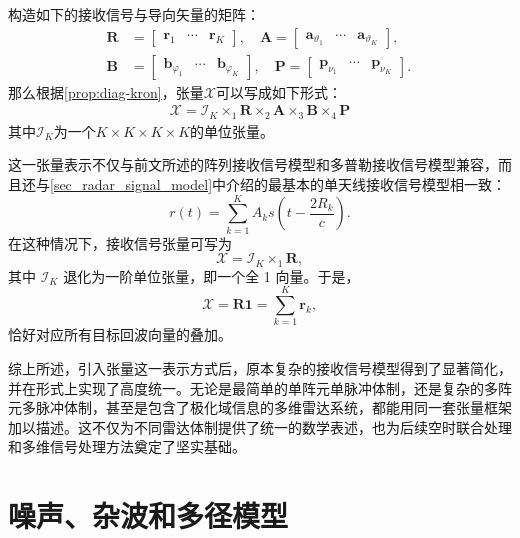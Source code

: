构造如下的接收信号与导向矢量的矩阵：
\[
    \begin{split}
        \mathbf{R} & = \begin{bmatrix}
                           \bm{r}_1 & \cdots & \bm{r}_K
                       \end{bmatrix}, \quad
        \mathbf{A} = \begin{bmatrix}
                         \bm{a}_{\vartheta_1} & \cdots & \bm{a}_{\vartheta_K}
                     \end{bmatrix}, \quad \\
        \mathbf{B} & = \begin{bmatrix}
                           \bm{b}_{\varphi_1} & \cdots & \bm{b}_{\varphi_K}
                       \end{bmatrix}, \quad
        \mathbf{P} = \begin{bmatrix}
                         \bm{p}_{\nu_1} & \cdots & \bm{p}_{\nu_K}
                     \end{bmatrix}.
    \end{split}
\]
那么根据\cref{prop:diag-kron}，张量\( \mathcal{X} \)可以写成如下形式：
\[
    \begin{split}
        \mathcal{X} = \mathcal{I}_K \times_1 \mathbf{R} \times_2 \mathbf{A} \times_3 \mathbf{B} \times_4 \mathbf{P}
    \end{split}
\]
其中\( \mathcal{I}_K \)为一个\( K \times K \times K \times K \)的单位张量。

这一张量表示不仅与前文所述的阵列接收信号模型和多普勒接收信号模型兼容，而且还与\cref{sec_radar_signal_model}中介绍的最基本的单天线接收信号模型相一致：
\[
    r(t) = \sum_{k=1}^{K} A_k s\!\left(t - \frac{2 R_k}{c}\right).
\]
在这种情况下，接收信号张量可写为
\[
    \mathcal{X} = \mathcal{I}_K \times_1 \mathbf{R},
\]
其中 \(\mathcal{I}_K\) 退化为一阶单位张量，即一个全 1 向量。于是，
\[
    \mathcal{X} = \mathbf{R}\bm{1} = \sum_{k=1}^{K} \bm{r}_k,
\]
恰好对应所有目标回波向量的叠加。

综上所述，引入张量这一表示方式后，原本复杂的接收信号模型得到了显著简化，并在形式上实现了高度统一。无论是最简单的单阵元单脉冲体制，还是复杂的多阵元多脉冲体制，甚至是包含了极化域信息的多维雷达系统，都能用同一套张量框架加以描述。这不仅为不同雷达体制提供了统一的数学表述，也为后续空时联合处理和多维信号处理方法奠定了坚实基础。

\section{噪声、杂波和多径模型}

